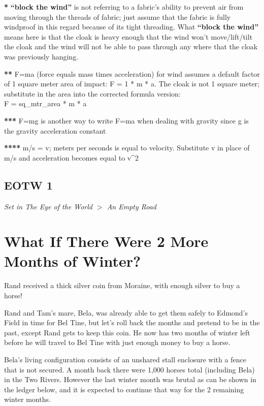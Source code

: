 \documentclass{article}
\begin{document}
\noindent \scriptsize \textbf{*} \textbf{``block the wind''} is not referring
to a fabric's ability to prevent air from moving
through the threads of fabric; just assume that the fabric is fully windproof
in this regard because of its tight threading.
What \textbf{``block the wind''} means here
is that the cloak is heavy enough that the wind won't move/lift/tilt the cloak
and the wind will
not be able to pass through any where that the cloak was previously hanging.

\noindent \scriptsize \textbf{**} F=ma (force equals mass times acceleration)
for wind assumes a default factor of
1 square meter area of impact: F = 1 * m * a. The cloak is not 1 square meter;
substitute in the area into the corrected formula version:\\ \indent
F = sq\_mtr\_area * m * a

\noindent \scriptsize \textbf{***} F=mg is another way to write F=ma when
dealing with gravity since g is the gravity acceleration constant

\noindent \scriptsize \textbf{****} m/s = v; meters per seconds is equal to velocity. Substitute v in place of m/s and acceleration becomes equal to v^{2}

\subsection*{EOTW 1}
\textit{ Set in The Eye of the World $>$ An Empty Road }  \pagebreak

\section*{What If There Were 2 More Months of Winter?}

Rand received a thick silver coin from Moraine,
with enough silver to buy a horse!

Rand and Tam's mare, Bela, was already able to get them safely
to Edmond's Field in time for Bel Tine, but let's roll back the months
and pretend to be in the past,
except Rand gets to keep this coin. He now has two months of winter left
before he will travel to Bel Tine with just enough money to buy a horse.

Bela's living configuration consists of an unshared stall enclosure
with a fence
that is not secured. A month back there were 1,000 horses total (including Bela) in the Two Rivers.
However the last winter month was brutal as can be shown in the ledger below,
and it is expected to continue that way for the 2 remaining winter months.
\end{document}
